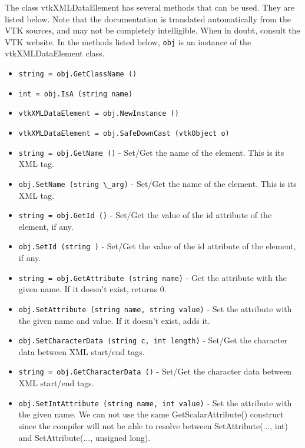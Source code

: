 The class vtkXMLDataElement has several methods that can be used.
  They are listed below.
Note that the documentation is translated automatically from the VTK sources,
and may not be completely intelligible.  When in doubt, consult the VTK website.
In the methods listed below, \verb|obj| is an instance of the vtkXMLDataElement class.
\begin{itemize}
\item  \verb|string = obj.GetClassName ()|

\item  \verb|int = obj.IsA (string name)|

\item  \verb|vtkXMLDataElement = obj.NewInstance ()|

\item  \verb|vtkXMLDataElement = obj.SafeDownCast (vtkObject o)|

\item  \verb|string = obj.GetName ()| -  Set/Get the name of the element.  This is its XML tag.

\item  \verb|obj.SetName (string \_arg)| -  Set/Get the name of the element.  This is its XML tag.

\item  \verb|string = obj.GetId ()| -  Set/Get the value of the id attribute of the element, if any.

\item  \verb|obj.SetId (string )| -  Set/Get the value of the id attribute of the element, if any.

\item  \verb|string = obj.GetAttribute (string name)| -  Get the attribute with the given name.  If it doesn't exist,
 returns 0.

\item  \verb|obj.SetAttribute (string name, string value)| -  Set the attribute with the given name and value. If it doesn't exist,
 adds it.

\item  \verb|obj.SetCharacterData (string c, int length)| -  Set/Get the character data between XML start/end tags.

\item  \verb|string = obj.GetCharacterData ()| -  Set/Get the character data between XML start/end tags.

\item  \verb|obj.SetIntAttribute (string name, int value)| -  Set the attribute with the given name.
 We can not use the same GetScalarAttribute() construct since
 the compiler will not be able to resolve between
 SetAttribute(..., int) and SetAttribute(..., unsigned long).


\end{itemize}
